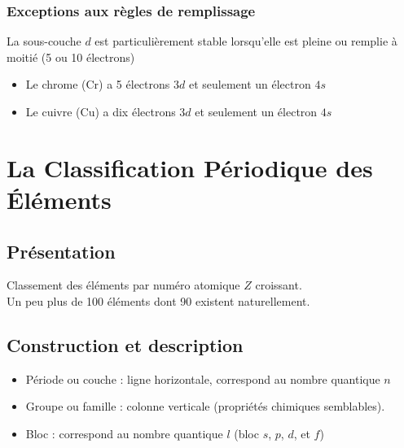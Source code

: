\documentclass[13pt, twoside, a4paper, french, tikz]{report}
\begin{document}
{      \subsection{Exceptions aux règles de remplissage}\label{subsec:exceptions-aux-regles-de-remplissage}
      
      La sous-couche $d$ est particulièrement stable lorsqu'elle est pleine ou remplie à moitié (5 ou 10 électrons)
      \begin{itemize}
        \item Le chrome (Cr) a 5 électrons $3d$ et seulement un électron $4s$
        \item Le cuivre (Cu) a dix électrons $3d$ et seulement un électron $4s$
      \end{itemize}
    }


\chapter{La Classification Périodique des Éléments}\label{ch:la-classification-periodique-des-elements}
  
  
  \section{Présentation}\label{sec:presentation}
    
    Classement des éléments par numéro atomique $Z$ croissant.\\
    Un peu plus de 100 éléments dont 90 existent naturellement.
  
  
  \section{Construction et description}\label{sec:construction-et-description}
    
    \resizebox{\textwidth}{!}{
      
    }
    
    \begin{itemize}
      \item Période ou couche : ligne horizontale, correspond au nombre quantique $n$
      \item Groupe ou famille : colonne verticale (propriétés chimiques semblables).
      \item Bloc : correspond au nombre quantique $l$ (bloc $s$, $p$, $d$, et $f$)
    \end{itemize}
    
    \vspace{7pt}
    
\end{document}
